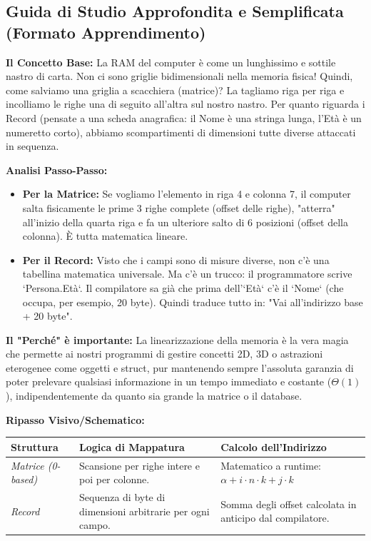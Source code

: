 \documentclass[a4paper, 11pt]{report}
\begin{document}
\vspace{0.5cm}
\subsection*{Guida di Studio Approfondita e Semplificata (Formato Apprendimento)}


\textbf{Il Concetto Base:}
La RAM del computer è come un lunghissimo e sottile nastro di carta. Non ci sono griglie bidimensionali nella memoria fisica! Quindi, come salviamo una griglia a scacchiera (matrice)? La tagliamo riga per riga e incolliamo le righe una di seguito all'altra sul nostro nastro. Per quanto riguarda i Record (pensate a una scheda anagrafica: il Nome è una stringa lunga, l'Età è un numeretto corto), abbiamo scompartimenti di dimensioni tutte diverse attaccati in sequenza.

\textbf{Analisi Passo-Passo:}
\begin{itemize}
\item \textbf{Per la Matrice:} Se vogliamo l'elemento in riga 4 e colonna 7, il computer salta fisicamente le prime 3 righe complete (offset delle righe), "atterra" all'inizio della quarta riga e fa un ulteriore salto di 6 posizioni (offset della colonna). È tutta matematica lineare.
\item \textbf{Per il Record:} Visto che i campi sono di misure diverse, non c'è una tabellina matematica universale. Ma c'è un trucco: il programmatore scrive `Persona.Età`. Il compilatore sa già che prima dell'`Età` c'è il `Nome` (che occupa, per esempio, 20 byte). Quindi traduce tutto in: "Vai all'indirizzo base + 20 byte".
\end{itemize}

\textbf{Il "Perché" è importante:}
La linearizzazione della memoria è la vera magia che permette ai nostri programmi di gestire concetti 2D, 3D o astrazioni eterogenee come oggetti e struct, pur mantenendo sempre l'assoluta garanzia di poter prelevare qualsiasi informazione in un tempo immediato e costante ($\Theta(1)$), indipendentemente da quanto sia grande la matrice o il database.

\textbf{Ripasso Visivo/Schematico:}
\begin{center}
\begin{tabular}{|l|p{4.5cm}|p{5cm}|}
\hline
\textbf{Struttura} & \textbf{Logica di Mappatura} & \textbf{Calcolo dell'Indirizzo} \\
\hline
\textit{Matrice (0-based)} & Scansione per righe intere e poi per colonne. & Matematico a runtime: $\alpha + i \cdot n \cdot k + j \cdot k$ \\
\hline
\textit{Record} & Sequenza di byte di dimensioni arbitrarie per ogni campo. & Somma degli offset calcolata in anticipo dal compilatore. \\
\hline
\end{tabular}
\end{center}
\end{document}

